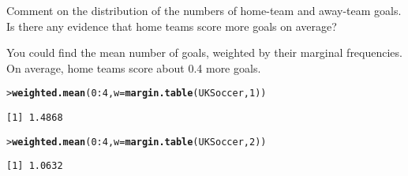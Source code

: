 \documentclass[11pt]{report}\usepackage[]{graphicx}\usepackage[]{color}
\makeatletter
\newcommand{\hlnum}[1]{\textcolor[rgb]{0.686,0.059,0.569}{#1}}%
\newcommand{\hlopt}[1]{\textcolor[rgb]{0,0,0}{#1}}%
\newcommand{\hlstd}[1]{\textcolor[rgb]{0.345,0.345,0.345}{#1}}%
\newcommand{\hlkwc}[1]{\textcolor[rgb]{0.333,0.667,0.333}{#1}}%
\newcommand{\hlkwd}[1]{\textcolor[rgb]{0.737,0.353,0.396}{\textbf{#1}}}%
\newenvironment{kframe}{%
 \def\at@end@of@kframe{}%
 \ifinner\ifhmode%
  \def\at@end@of@kframe{\end{minipage}}%
  \begin{minipage}{\columnwidth}%
 \fi\fi%
 \def\FrameCommand##1{\hskip\@totalleftmargin \hskip-\fboxsep
 \colorbox{shadecolor}{##1}\hskip-\fboxsep
     \hskip-\linewidth \hskip-\@totalleftmargin \hskip\columnwidth}%
 \MakeFramed {\advance\hsize-\width
   \@totalleftmargin\z@ \linewidth\hsize
   \@setminipage}}%
 {\par\unskip\endMakeFramed%
 \at@end@of@kframe}
\newenvironment{knitrout}{}{} %
\renewenvironment{knitrout}{\small\renewcommand{\baselinestretch}{.85}}{} %
\makeatother
\begin{document}
\begin{Exercises}
\begin{enumerate*}
    \item Comment on the distribution of the numbers of home-team and away-team
    goals.  Is there any evidence that home teams score more goals on average?
    \begin{ans}
      You could find the mean number of goals, weighted by their marginal frequencies.
      On average, home teams score about 0.4 more goals.
\begin{knitrout}
\color{fgcolor}\begin{kframe}
\begin{alltt}
\hlstd{> }\hlkwd{weighted.mean}\hlstd{(}\hlnum{0}\hlopt{:}\hlnum{4}\hlstd{,} \hlkwc{w}\hlstd{=}\hlkwd{margin.table}\hlstd{(UKSoccer,}\hlnum{1}\hlstd{))}
\end{alltt}
\begin{verbatim}
[1] 1.4868
\end{verbatim}
\begin{alltt}
\hlstd{> }\hlkwd{weighted.mean}\hlstd{(}\hlnum{0}\hlopt{:}\hlnum{4}\hlstd{,} \hlkwc{w}\hlstd{=}\hlkwd{margin.table}\hlstd{(UKSoccer,}\hlnum{2}\hlstd{))}
\end{alltt}
\begin{verbatim}
[1] 1.0632
\end{verbatim}
\end{kframe}
\end{knitrout}
    \end{ans}
    

  \end{enumerate*}


\end{Exercises}
\end{document}
